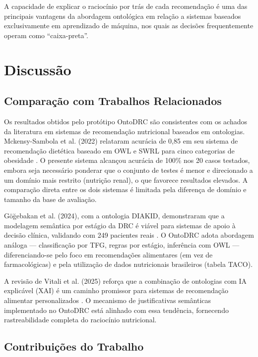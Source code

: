 \documentclass[12pt, a4paper, twocolumn]{article}
\begin{document}
A capacidade de explicar o raciocínio por trás de cada recomendação é uma das principais vantagens da abordagem ontológica em relação a sistemas baseados exclusivamente em aprendizado de máquina, nos quais as decisões frequentemente operam como ``caixa-preta''.

\section{Discussão}

    \subsection{Comparação com Trabalhos Relacionados}

Os resultados obtidos pelo protótipo OntoDRC são consistentes com os achados da literatura em sistemas de recomendação nutricional baseados em ontologias. Mckensy-Sambola et al. (2022) relataram acurácia de 0,85 em seu sistema de recomendação dietética baseado em OWL e SWRL para cinco categorias de obesidade \cite{mckensy2022}. O presente sistema alcançou acurácia de 100\% nos 20 casos testados, embora seja necessário ponderar que o conjunto de testes é menor e direcionado a um domínio mais restrito (nutrição renal), o que favorece resultados elevados. A comparação direta entre os dois sistemas é limitada pela diferença de domínio e tamanho da base de avaliação.

Göğebakan et al. (2024), com a ontologia DIAKID, demonstraram que a modelagem semântica por estágio da DRC é viável para sistemas de apoio à decisão clínica, validando com 249 pacientes reais \cite{gogebakan2024}. O OntoDRC adota abordagem análoga --- classificação por TFG, regras por estágio, inferência com OWL --- diferenciando-se pelo foco em recomendações alimentares (em vez de farmacológicas) e pela utilização de dados nutricionais brasileiros (tabela TACO).

A revisão de Vitali et al. (2025) reforça que a combinação de ontologias com IA explicável (XAI) é um caminho promissor para sistemas de recomendação alimentar personalizados \cite{vitali2025}. O mecanismo de justificativas semânticas implementado no OntoDRC está alinhado com essa tendência, fornecendo rastreabilidade completa do raciocínio nutricional.

    \subsection{Contribuições do Trabalho}
\end{document}
